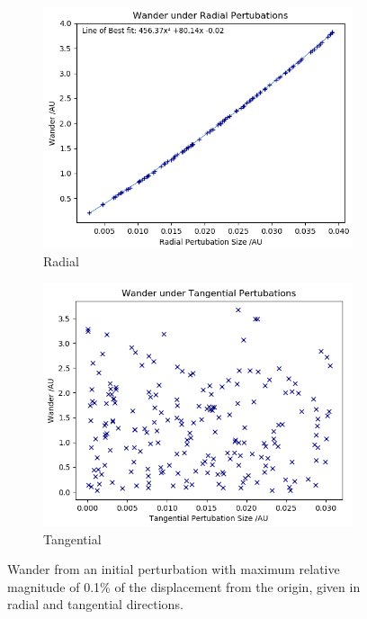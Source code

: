\documentclass[11pt, a4paper,twocolumn]{article} %
\begin{document}
\begin{figure}[ht]
	\centering
	\begin{subfigure}{.45\textwidth}
		\centering
		\includegraphics[width=\linewidth]{Figures/wanderagainstradialpertubation2}  
		\caption{Radial}
		\label{fig:wander_rad}
	\end{subfigure}
	\hfill %
	\begin{subfigure}{.45\textwidth}
		\centering
		\includegraphics[width=\linewidth]{Figures/wanderagainsttangentialpertubation2}  
		\caption{Tangential}
		\label{fig:wander_tan}
	\end{subfigure}
	\caption{Wander from an initial perturbation with maximum relative magnitude of 0.1\% of the displacement from the origin, given in radial and tangential directions.}
	\label{fig:wanderplots}
\end{figure}
\end{document}
